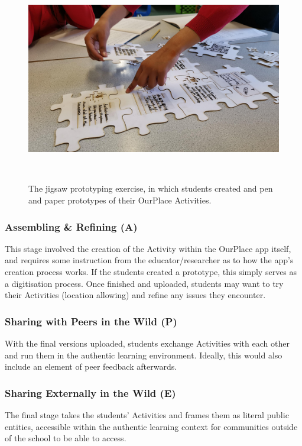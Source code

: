 \documentclass[,hyphens]{sigchi}
\begin{document}
\begin{figure}
\centering
  \includegraphics[width=1\columnwidth]{figures/jigsaw}
  \caption{The jigsaw prototyping exercise, in which students created and pen and paper prototypes of their OurPlace Activities.}~\label{fig:Jigsaw}
\end{figure}

\subsubsection{Assembling \& Refining (A)}

This stage involved the creation of the Activity within the OurPlace app itself, and requires some instruction from the educator/researcher as to how the app's creation process works. If the students created a prototype, this simply serves as a digitisation process. Once finished and uploaded, students may want to try their Activities (location allowing) and refine any issues they encounter.  

\subsubsection{Sharing with Peers in the Wild (P)}

With the final versions uploaded, students exchange Activities with each other and run them in the authentic learning environment. Ideally, this would also include an element of peer feedback afterwards.

\subsubsection{Sharing Externally in the Wild (E)}

The final stage takes the students' Activities and frames them as literal public entities, accessible within the authentic learning context for communities outside of the school to be able to access.
\end{document}
